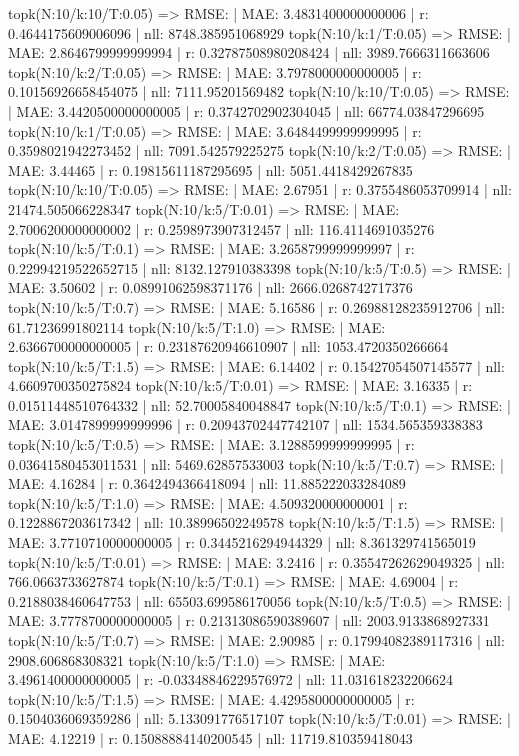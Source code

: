 topk(N:10/k:10/T:0.05) => RMSE: | MAE: 3.4831400000000006 | r: 0.4644175609006096 | nll: 8748.385951068929
topk(N:10/k:1/T:0.05) => RMSE: | MAE: 2.8646799999999994 | r: 0.32787508980208424 | nll: 3989.7666311663606
topk(N:10/k:2/T:0.05) => RMSE: | MAE: 3.7978000000000005 | r: 0.10156926658454075 | nll: 7111.95201569482
topk(N:10/k:10/T:0.05) => RMSE: | MAE: 3.4420500000000005 | r: 0.3742702902304045 | nll: 66774.03847296695
topk(N:10/k:1/T:0.05) => RMSE: | MAE: 3.6484499999999995 | r: 0.3598021942273452 | nll: 7091.542579225275
topk(N:10/k:2/T:0.05) => RMSE: | MAE: 3.44465 | r: 0.19815611187295695 | nll: 5051.4418429267835
topk(N:10/k:10/T:0.05) => RMSE: | MAE: 2.67951 | r: 0.3755486053709914 | nll: 21474.505066228347
topk(N:10/k:5/T:0.01) => RMSE: | MAE: 2.7006200000000002 | r: 0.2598973907312457 | nll: 116.4114691035276
topk(N:10/k:5/T:0.1) => RMSE: | MAE: 3.2658799999999997 | r: 0.22994219522652715 | nll: 8132.127910383398
topk(N:10/k:5/T:0.5) => RMSE: | MAE: 3.50602 | r: 0.08991062598371176 | nll: 2666.0268742717376
topk(N:10/k:5/T:0.7) => RMSE: | MAE: 5.16586 | r: 0.26988128235912706 | nll: 61.71236991802114
topk(N:10/k:5/T:1.0) => RMSE: | MAE: 2.6366700000000005 | r: 0.23187620946610907 | nll: 1053.4720350266664
topk(N:10/k:5/T:1.5) => RMSE: | MAE: 6.14402 | r: 0.15427054507145577 | nll: 4.6609700350275824
topk(N:10/k:5/T:0.01) => RMSE: | MAE: 3.16335 | r: 0.01511448510764332 | nll: 52.70005840048847
topk(N:10/k:5/T:0.1) => RMSE: | MAE: 3.0147899999999996 | r: 0.20943702447742107 | nll: 1534.565359338383
topk(N:10/k:5/T:0.5) => RMSE: | MAE: 3.1288599999999995 | r: 0.03641580453011531 | nll: 5469.62857533003
topk(N:10/k:5/T:0.7) => RMSE: | MAE: 4.16284 | r: 0.3642494366418094 | nll: 11.885222033284089
topk(N:10/k:5/T:1.0) => RMSE: | MAE: 4.509320000000001 | r: 0.1228867203617342 | nll: 10.38996502249578
topk(N:10/k:5/T:1.5) => RMSE: | MAE: 3.7710710000000005 | r: 0.3445216294944329 | nll: 8.361329741565019
topk(N:10/k:5/T:0.01) => RMSE: | MAE: 3.2416 | r: 0.35547262629049325 | nll: 766.0663733627874
topk(N:10/k:5/T:0.1) => RMSE: | MAE: 4.69004 | r: 0.2188038460647753 | nll: 65503.699586170056
topk(N:10/k:5/T:0.5) => RMSE: | MAE: 3.7778700000000005 | r: 0.21313086590389607 | nll: 2003.9133868927331
topk(N:10/k:5/T:0.7) => RMSE: | MAE: 2.90985 | r: 0.17994082389117316 | nll: 2908.606868308321
topk(N:10/k:5/T:1.0) => RMSE: | MAE: 3.4961400000000005 | r: -0.03348846229576972 | nll: 11.031618232206624
topk(N:10/k:5/T:1.5) => RMSE: | MAE: 4.4295800000000005 | r: 0.1504036069359286 | nll: 5.133091776517107
topk(N:10/k:5/T:0.01) => RMSE: | MAE: 4.12219 | r: 0.15088884140200545 | nll: 11719.810359418043
